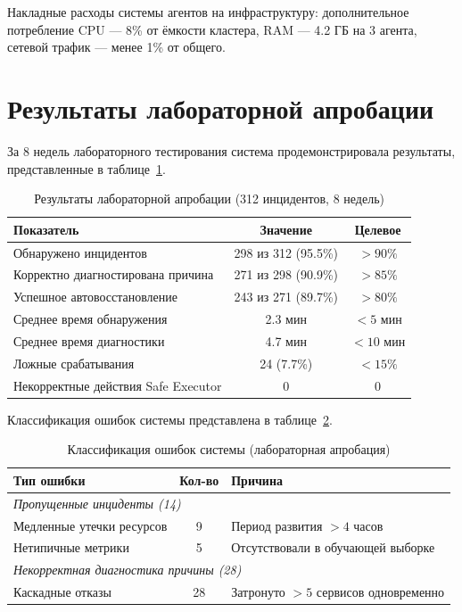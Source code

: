 Накладные расходы системы агентов на инфраструктуру: дополнительное потребление CPU --- 8\% от ёмкости кластера, RAM --- 4.2 ГБ на 3 агента, сетевой трафик --- менее 1\% от общего.

\section{Результаты лабораторной апробации}

За 8 недель лабораторного тестирования система продемонстрировала результаты, представленные в таблице~\ref{tab:lab_aprobation_results}.

\begin{table}[H]
\centering
\caption{Результаты лабораторной апробации (312 инцидентов, 8 недель)}
\label{tab:lab_aprobation_results}
\small
\begin{tabular}{|p{5cm}|c|c|}
\hline
\textbf{Показатель} & \textbf{Значение} & \textbf{Целевое} \\
\hline
Обнаружено инцидентов & 298 из 312 (95.5\%) & $> 90\%$ \\
\hline
Корректно диагностирована причина & 271 из 298 (90.9\%) & $> 85\%$ \\
\hline
Успешное автовосстановление & 243 из 271 (89.7\%) & $> 80\%$ \\
\hline
Среднее время обнаружения & 2.3 мин & $< 5$ мин \\
\hline
Среднее время диагностики & 4.7 мин & $< 10$ мин \\
\hline
Ложные срабатывания & 24 (7.7\%) & $< 15\%$ \\
\hline
Некорректные действия Safe Executor & 0 & 0 \\
\hline
\end{tabular}
\end{table}

Классификация ошибок системы представлена в таблице~\ref{tab:error_breakdown}.

\begin{table}[H]
\centering
\caption{Классификация ошибок системы (лабораторная апробация)}
\label{tab:error_breakdown}
\small
\begin{tabular}{|p{3.5cm}|c|p{6cm}|}
\hline
\textbf{Тип ошибки} & \textbf{Кол-во} & \textbf{Причина} \\
\hline
\multicolumn{3}{|l|}{\textit{Пропущенные инциденты (14)}} \\
\hline
Медленные утечки ресурсов & 9 & Период развития $> 4$ часов \\
\hline
Нетипичные метрики & 5 & Отсутствовали в обучающей выборке \\
\hline
\multicolumn{3}{|l|}{\textit{Некорректная диагностика причины (28)}} \\
\hline
Каскадные отказы & 28 & Затронуто $> 5$ сервисов одновременно \\
\hline
\end{tabular}
\end{table}

